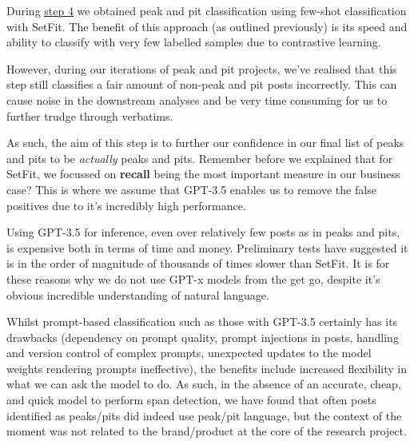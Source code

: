 \documentclass[
  letterpaper,
  DIV=11,
  numbers=noendperiod]{scrreprt}
\begin{document}
During \hyperref[step-four]{step 4} we obtained peak and pit
classification using few-shot classification with SetFit. The benefit of
this approach (as outlined previously) is its speed and ability to
classify with very few labelled samples due to contrastive learning.

However, during our iterations of peak and pit projects, we've realised
that this step still classifies a fair amount of non-peak and pit posts
incorrectly. This can cause noise in the downstream analyses and be very
time consuming for us to further trudge through verbatims.

As such, the aim of this step is to further our confidence in our final
list of peaks and pits to be \emph{actually} peaks and pits. Remember
before we explained that for SetFit, we focussed on \textbf{recall}
being the most important measure in our business case? This is where we
assume that GPT-3.5 enables us to remove the false positives due to it's
incredibly high performance.

\begin{tcolorbox}[enhanced jigsaw, opacitybacktitle=0.6, breakable, title=\textcolor{quarto-callout-important-color}{\faExclamation}\hspace{0.5em}{Why not use GPT from the start?}, arc=.35mm, colframe=quarto-callout-important-color-frame, colbacktitle=quarto-callout-important-color!10!white, left=2mm, bottomrule=.15mm, opacityback=0, toprule=.15mm, bottomtitle=1mm, toptitle=1mm, titlerule=0mm, leftrule=.75mm, colback=white, rightrule=.15mm, coltitle=black]

Using GPT-3.5 for inference, even over relatively few posts as in peaks
and pits, is expensive both in terms of time and money. Preliminary
tests have suggested it is in the order of magnitude of thousands of
times slower than SetFit. It is for these reasons why we do not use
GPT-x models from the get go, despite it's obvious incredible
understanding of natural language.

\end{tcolorbox}

Whilst prompt-based classification such as those with GPT-3.5 certainly
has its drawbacks (dependency on prompt quality, prompt injections in
posts, handling and version control of complex prompts, unexpected
updates to the model weights rendering prompts ineffective), the
benefits include increased flexibility in what we can ask the model to
do. As such, in the absence of an accurate, cheap, and quick model to
perform span detection, we have found that often posts identified as
peaks/pits did indeed use peak/pit language, but the context of the
moment was not related to the brand/product at the core of the research
project.
\end{document}
